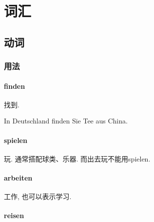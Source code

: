 \documentclass[hidelinks]{ctexart}
\begin{document}



\section{词汇} %
\label{sec:词汇}

\subsection{动词} %
\label{sub:动词}

\subsubsection{用法} %
\label{ssub:用法}

\paragraph{finden} %
\label{par:finden}

找到.
\begin{sample}
    \begin{linguaex}
        In Deutschland finden Sie Tee aus China.
    \end{linguaex}
\end{sample}


\paragraph{spielen} %
\label{par:spielen}

玩. 通常搭配球类、乐器. 而出去玩不能用spielen.


\paragraph{arbeiten} %
\label{par:arbeiten}

工作, 也可以表示学习.


\paragraph{reisen} %
\label{par:reisen}
\end{document}

